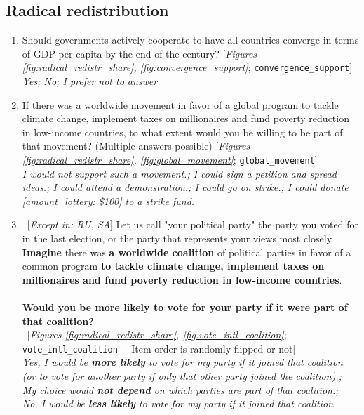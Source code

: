  \subsection*{Radical redistribution} 
 \begin{enumerate}[resume] 
\item  \label{q:convergence_support} Should governments actively cooperate to have all countries converge in terms of GDP per capita by the end of the century? [\textit{Figures \ref{fig:radical_redistr_share}, \ref{fig:convergence_support}}; 
\verb|convergence_support|]
  \\ \textit{Yes; No; I prefer not to answer}

\item  \label{q:global_movement} If there was a worldwide movement in favor of a global program to tackle climate change, implement taxes on millionaires and fund poverty reduction in low-income countries, to what extent would you be willing to be part of that movement? (Multiple answers possible) [\textit{Figures \ref{fig:radical_redistr_share}, \ref{fig:global_movement}}; 
\verb|global_movement|]
  \\ \textit{I would \textit{not} support such a movement.; I could sign a petition and spread ideas.; I could attend a demonstration.; I could go on strike.; I could donate [amount\_lottery: \$100] to a strike fund.}

\item ~[\textit{Except in: RU, SA}] \label{q:vote_intl_coalition} Let us call "your political party" the party you voted for in the last election, or the party that represents your views most closely.~\\\textbf{Imagine }there was \textbf{a worldwide coalition} of political parties in favor of a common program \textbf{to tackle climate change, implement taxes on millionaires and fund poverty reduction in low-income countries}.~\\\\\textbf{Would you be more likely to vote for your party if it were part of that coalition?}\\ 
~[\textit{Figures \ref{fig:radical_redistr_share}, \ref{fig:vote_intl_coalition}}; 
\verb|vote_intl_coalition|]
~[Item order is randomly flipped or not]
  \\ \textit{Yes, I would be \textbf{more likely} to vote for my party if it joined that coalition (or to vote for another party if only that other party joined the coalition).; \\My choice would \textbf{not depend} on which parties are part of that coalition.; \\No, I would be \textbf{less likely} to vote for my party if it joined that coalition.}


\end{enumerate}
